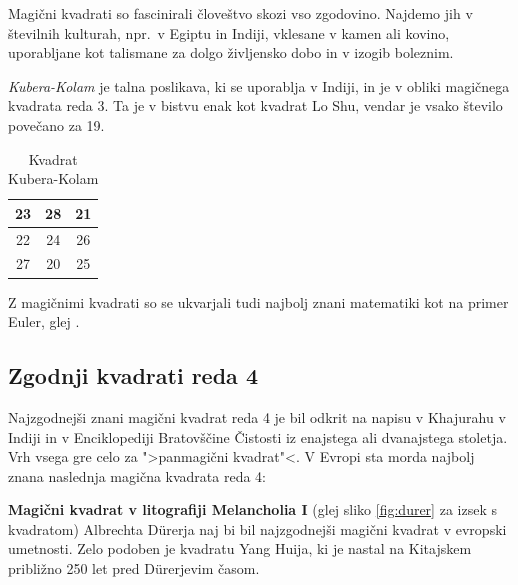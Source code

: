 \documentclass[a4paper,12pt]{article}
\newcommand{\pojem}[1]{\emph{\color{purple}#1}}
\newenvironment{magic}[3]{\begin{table}[!ht]
   \large
   \centering
   \caption{#1}
   \label{#2}
   \begin{tabular}{|*{#3}{c|}}
      \hline}
{\end{tabular}
\end{table}}
\begin{document}
Magični kvadrati so fascinirali človeštvo skozi vso zgodovino. Najdemo jih
v številnih kulturah, npr.\ v Egiptu in Indiji, vklesane v kamen ali
kovino, uporabljane kot talismane za dolgo življensko dobo in v
izogib boleznim. %

\pojem{Kubera-Kolam} je talna poslikava, ki se uporablja v Indiji, in je v
obliki magičnega kvadrata reda 3. Ta je v bistvu enak kot kvadrat
Lo Shu, vendar je vsako število povečano za 19.


\begin{magic}{Kvadrat Kubera-Kolam}{table:kubera}{3}
	23 & 28 & 21 \\\hline
   22 & 24 & 26 \\\hline
   27 & 20 & 25 \\\hline
\end{magic}

Z magičnimi kvadrati so se ukvarjali tudi najbolj znani matematiki kot na
primer Euler, glej \cite{euler}. %


\subsection{Zgodnji kvadrati reda 4}

Najzgodnejši znani magični kvadrat reda 4 je bil odkrit na napisu
v Khajurahu v Indiji in v Enciklopediji Bratovščine Čistosti iz enajstega
ali dvanajstega stoletja. Vrh vsega gre celo za ">panmagični kvadrat"<.
V Evropi sta morda najbolj znana naslednja magična kvadrata reda 4:

\bigskip
\textbf{Magični kvadrat v litografiji Melancholia I} (glej sliko \ref{fig:durer}
za izsek s kvadratom) Albrechta Dürerja naj bi bil najzgodnejši magični kvadrat
v evropski umetnosti. Zelo podoben je kvadratu Yang Huija, ki je nastal na Kitajskem
približno 250 let pred Dürerjevim časom. %
\end{document}
